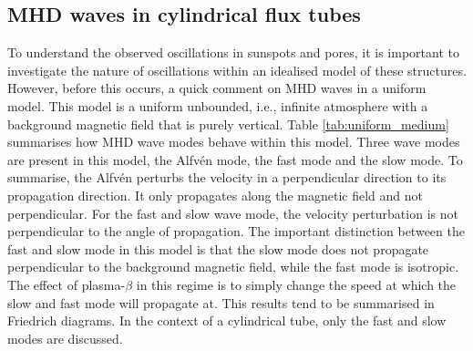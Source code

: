 \subsection{MHD waves in cylindrical flux tubes}
\label{waves}

    To understand the observed oscillations in sunspots and pores, it is important to investigate the nature of oscillations within an idealised model of these structures.
    However, before this occurs, a quick comment on MHD waves in a uniform model.
    This model is a uniform unbounded, i.e., infinite atmosphere with a background magnetic field that is purely vertical.
    Table \ref{tab:uniform_medium} summarises how MHD wave modes behave within this model.
    Three wave modes are present in this model, the Alfv\'{e}n mode, the fast mode and the slow mode.
    To summarise, the Alfv\'{e}n perturbs the velocity in a perpendicular direction to its propagation direction. 
    It only propagates along the magnetic field and not perpendicular.
    For the fast and slow wave mode, the velocity perturbation is not perpendicular to the angle of propagation.
    The important distinction between the fast and slow mode in this model is that the slow mode does not propagate perpendicular to the background magnetic field, while the fast mode is isotropic.
    The effect of plasma-$\beta$ in this regime is to simply change the speed at which the slow and fast mode will propagate at.  
    This results tend to be summarised in Friedrich diagrams. 
    In the context of a cylindrical tube, only the fast and slow modes are discussed.
             

